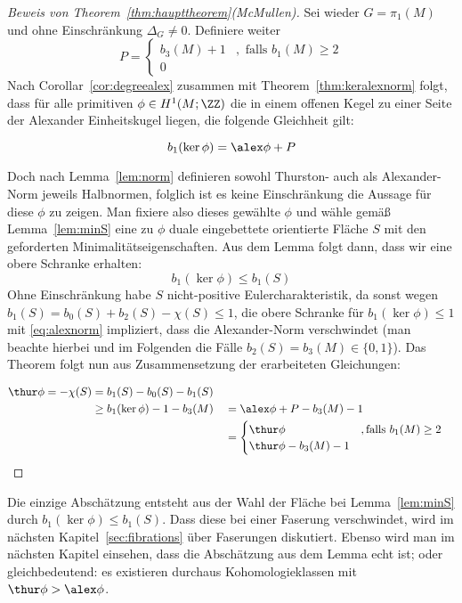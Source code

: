 \begin{proof}[Beweis von Theorem~\ref{thm:haupttheorem}(McMullen)]
	Sei wieder $G=\pi_1(M)$ und ohne Einschränkung $\Delta_G\neq 0$. Definiere weiter \[
	P=\begin{cases}
		b_3(M)+1 &, \text{ falls } b_1(M) \geq 2	\\
		0
	\end{cases}
	\]	
	Nach Corollar~\ref{cor:degreealex} zusammen mit Theorem~\ref{thm:keralexnorm} folgt, dass für alle primitiven $\phi \in H^1(M;\ZZ)$ die in einem offenen Kegel zu einer Seite der Alexander Einheitskugel liegen, die folgende Gleichheit gilt:
	
		\begin{equation}
		b_1(\ker\phi)= \alex \phi + P \label{eq:alexnorm}
		\end{equation}
	
	Doch nach Lemma~\ref{lem:norm} definieren sowohl Thurston- auch als Alexander-Norm jeweils Halbnormen, folglich ist es keine Einschränkung die Aussage für diese $\phi$ zu zeigen. Man fixiere also dieses gewählte $\phi$ und wähle gemäß Lemma~\ref{lem:minS} eine zu $\phi$ duale eingebettete orientierte Fläche $S$ mit den geforderten Minimalitätseigenschaften. Aus dem Lemma folgt dann, dass wir eine obere Schranke erhalten:
	\begin{equation}
		b_1(\ker\phi) \leq b_1(S) \label{eq:obereSchrankeS}
	\end{equation}
	Ohne Einschränkung habe $S$ nicht-positive Eulercharakteristik, da sonst wegen $b_1(S)= b_0(S) + b_2(S) - \chi(S) \leq 1$, die obere Schranke für $b_1(\ker\phi)\leq 1$  mit \eqref{eq:alexnorm} impliziert, dass die Alexander-Norm verschwindet (man beachte hierbei und im Folgenden die Fälle $b_2(S)=b_3(M) \in \{0,1\}$). Das Theorem folgt nun aus Zusammensetzung der erarbeiteten Gleichungen:
	
		\begin{align*}
		\thur \phi = -\chi(S) &= b_1(S)-b_0(S)-b_1(S)\\
					&\geq b_1(\ker\phi) -1-b_3(M) &&= \alex \phi +P -b_3(M)-1\\
					&&& = \begin{cases}
						\thur \phi &, \text{falls } b_1(M)\geq 2\\
						\thur \phi -b_3(M)-1
					\end{cases}
		\end{align*}
\end{proof} 
	Die einzige Abschätzung entsteht aus der Wahl der Fläche bei Lemma~\ref{lem:minS} durch $b_1(\ker\phi)\leq b_1(S)$. Dass diese bei einer Faserung verschwindet, wird im nächsten Kapitel~\ref{sec:fibrations} über Faserungen diskutiert. Ebenso wird man im nächsten Kapitel einsehen, dass die Abschätzung aus dem Lemma echt ist; oder gleichbedeutend: es existieren durchaus Kohomologieklassen mit $\thur \phi > \alex \phi$.